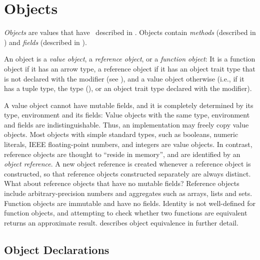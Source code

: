 %
%
%
%

\chapter{Objects}


\emph{Objects} are values that have \objecttypes\ described in
.
Objects contain \emph{methods} (described in ) and
\emph{fields} (described in ).

An object is a \emph{value object}, a \emph{reference object},
or a \emph{function object}:
It is a function object if it has an arrow type,
a reference object if it has an object trait type
that is not declared with the  modifier
(see ),
and a value object otherwise
(i.e., if it has a tuple type, the type (),
or an object trait type declared
with the  modifier).

A value object cannot have mutable fields,
and it is completely determined by its type,
environment and its fields:
Value objects with the same type, environment and fields
are indistinguishable.
Thus, an implementation may freely copy value objects.
Most objects with simple standard types,
such as booleans,
numeric literals,
IEEE floating-point numbers,
and integers are value objects.
%
In contrast,
reference objects are thought to ``reside in memory'',
and are identified by an \emph{object reference}.
A new object reference is created
whenever a reference object is constructed,
so that reference objects constructed separately are always distinct.
What about reference objects that have no mutable fields?
Reference objects include
arbitrary-precision numbers
and aggregates such as arrays, lists and sets.
%
Function objects are immutable and have no fields.  Identity is not
well-defined for function objects, and attempting to check whether two
functions are equivalent returns an approximate result.
 describes object equivalence in further detail.



\section{Object Declarations}

